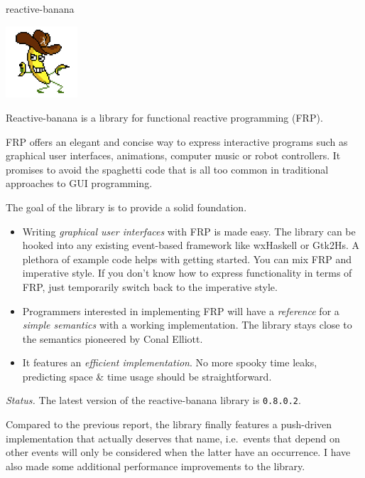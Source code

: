 \begin{hcarentry}[updated]{reactive-banana}
\makeheader

\begin{center}
\includegraphics[width=0.2\textwidth]{html/banana.jpg}
\end{center}

Reactive-banana is a library for functional reactive programming (FRP).

FRP offers an elegant and concise way to express interactive programs such as graphical user interfaces, animations, computer music or robot controllers. It promises to avoid the spaghetti code that is all too common in traditional approaches to GUI programming.

The goal of the library is to provide a solid foundation.
\begin{itemize}
\item Writing \emph{graphical user interfaces} with FRP is made easy. The library can be hooked into any existing event-based framework like wxHaskell or Gtk2Hs. A plethora of example code helps with getting started. You can mix FRP and imperative style. If you don't know how to express functionality in terms of FRP, just temporarily switch back to the imperative style.
\item Programmers interested in implementing FRP will have a \emph{reference} for a \emph{simple semantics} with a working implementation. The library stays close to the semantics pioneered by Conal Elliott.
\item It features an \emph{efficient implementation}. No more spooky time leaks, predicting space \& time usage should be straightforward.
\end{itemize}

\emph{Status.} The latest version of the reactive-banana library is \verb!0.8.0.2!.

Compared to the previous report, the library finally features a push-driven implementation that actually deserves that name, i.e.\ events that depend on other events will only be considered when the latter have an occurrence. I have also made some additional performance improvements to the library.


\end{hcarentry}
